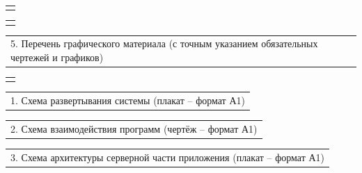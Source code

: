 \documentclass[12pt, А4, twoside]{article}
\begin{document}
\begin{FlushLeft}
    \begin{tabular}{p{17.25cm}}
        \vspace{0pt} \hline \\
    \end{tabular}

    \begin{tabular}{p{17.25cm}}
		\vspace{0pt} \hline \\
	\end{tabular}

    \vspace{-0.1 cm}

    \begin{tabular}{p{17.25cm}}
        \textsf{5. Перечень графического материала (с точным указанием обязательных чертежей и графиков)} \vspace{0pt} \hline \\
    \end{tabular}

    \begin{tabular}{p{17.25cm}}
        \vspace{0pt} \hline \\
    \end{tabular}

    \vspace{-0.1 cm}

    \begin{tabular}{p{17.25cm}}
        \hspace{0.3cm} \textsf{1. Схема развертывания системы (плакат -- формат А1)} \vspace{0pt} \hline  \\
    \end{tabular}

   \vspace{-0.1 cm}

    \begin{tabular}{p{17.25cm}}
        \hspace{0.3cm} \textsf{2. Схема взаимодействия программ (чертёж -- формат А1)} \vspace{0pt} \hline  \\
    \end{tabular}

    \vspace{-0.1 cm}

    \begin{tabular}{p{17.25cm}}
        \hspace{0.3cm} \textsf{3. Схема архитектуры серверной части приложения (плакат -- формат А1)} \vspace{0pt} \hline  \\
    \end{tabular}


\end{FlushLeft}
\end{document}

